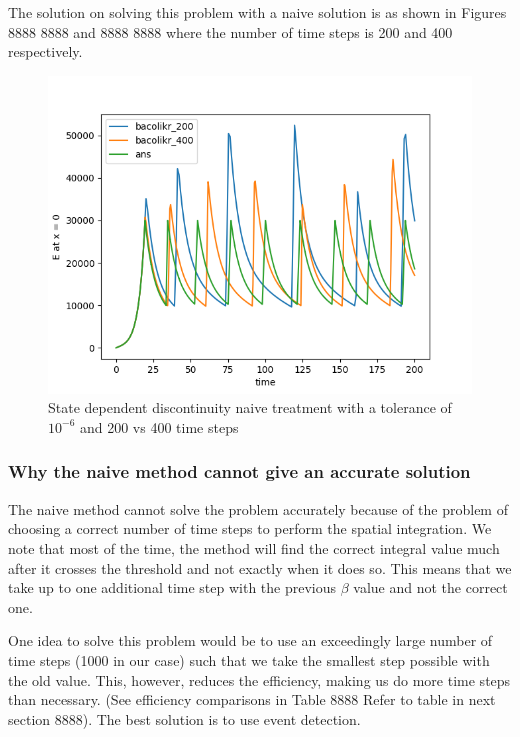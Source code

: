 \documentclass{article}
\begin{document}
The solution on solving this problem with a naive solution is as shown in Figures 8888 8888 and 8888 8888 where the number of time steps is 200 and 400 respectively. 

\begin{figure}[H]
\centering
\includegraphics[width=0.7\linewidth]{./figures/pde_state_disc_naive_200vs400}
\caption{State dependent discontinuity naive treatment with a tolerance of $10^{-6}$ and 200 vs 400 time steps}
\label{fig:pde_state_disc_naive_200vs400}
\end{figure}

\subsubsection{Why the naive method cannot give an accurate solution}
\label{subsubsection:pde_state_naive_always_inaccurate}
The naive method cannot solve the problem accurately because of the problem of choosing a correct number of time steps to perform the spatial integration. We note that most of the time, the method will find the correct integral value much after it crosses the threshold and not exactly when it does so. This means that we take up to one additional time step with the previous $\beta$ value and not the correct one.

One idea to solve this problem would be to use an exceedingly large number of time steps (1000 in our case) such that we take the smallest step possible with the old value. This, however, reduces the efficiency, making us do more time steps than necessary. (See efficiency comparisons in Table 8888 Refer to table in next section 8888). The best solution is to use event detection.
\end{document}
